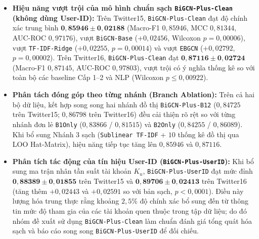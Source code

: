 \documentclass[11pt,a4paper]{extreport}
\begin{document}
\begin{itemize}
    \item \textbf{Hiệu năng vượt trội của mô hình chuẩn sạch \texttt{BiGCN-Plus-Clean} (không dùng User-ID):} Trên Twitter15, \texttt{BiGCN-Plus-Clean} đạt độ chính xác trung bình $\mathbf{0{,}85946 \pm 0{,}02188}$ (Macro-F1 $0{,}85946$, MCC $0{,}81344$, AUC-ROC $0{,}97176$), vượt \texttt{BiGCN-Base} ($+0{,}02456$, Wilcoxon $p = 0{,}00006$), vượt \texttt{TF-IDF-Ridge} ($+0{,}02255$, $p = 0{,}00014$) và vượt \texttt{EBGCN} ($+0{,}02792$, $p = 0{,}00002$). Trên Twitter16, \texttt{BiGCN-Plus-Clean} đạt $\mathbf{0{,}87116 \pm 0{,}02724}$ (Macro-F1 $0{,}87145$, AUC-ROC $0{,}97803$), vượt trội có ý nghĩa thống kê so với toàn bộ các baseline Cấp 1--2 và NLP (Wilcoxon $p \le 0{,}00922$).
    \item \textbf{Phân tách đóng góp theo từng nhánh (Branch Ablation):} Trên cả hai bộ dữ liệu, kết hợp song song hai nhánh đồ thị \texttt{BiGCN-Plus-B12} ($0{,}84725$ trên Twitter15; $0{,}86798$ trên Twitter16) đều cải thiện rõ rệt so với từng nhánh đơn lẻ \texttt{B1Only} ($0{,}83866$ / $0{,}81515$) và \texttt{B2Only} ($0{,}84255$ / $0{,}86089$). Khi bổ sung Nhánh 3 sạch (\texttt{Sublinear TF-IDF} + $10$ thống kê đồ thị qua LOO Hat-Matrix), hiệu năng tiếp tục tăng lên $0{,}85946$ và $0{,}87116$.
    \item \textbf{Phân tích tác động của tín hiệu User-ID (\texttt{BiGCN-Plus-UserID}):} Khi bổ sung ma trận nhân tần suất tài khoản $K_u$, \texttt{BiGCN-Plus-UserID} đạt mức đỉnh $\mathbf{0{,}88389 \pm 0{,}01855}$ trên Twitter15 và $\mathbf{0{,}89706 \pm 0{,}02413}$ trên Twitter16 (tăng thêm $+0{,}02443$ và $+0{,}02591$ so với bản sạch, $p < 0{,}0001$). Điều này lượng hóa trung thực rằng khoảng $2{,}5\%$ độ chính xác bổ sung đến từ thông tin mức độ tham gia của các tài khoản quen thuộc trong tập dữ liệu; do đó nhóm đề xuất sử dụng \texttt{BiGCN-Plus-Clean} làm chuẩn đánh giá tổng quát hóa sạch và báo cáo song song \texttt{BiGCN-Plus-UserID} để đối chiếu.
\end{itemize}
\end{document}
